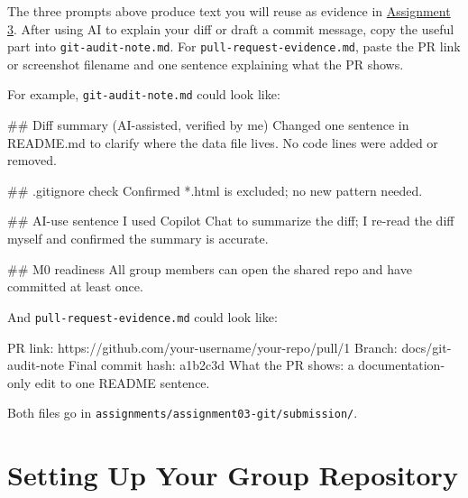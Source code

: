 \documentclass[
  letterpaper,
  DIV=11,
  numbers=noendperiod,
  oneside]{scrreprt}
\newenvironment{Shaded}{\begin{snugshade}}{\end{snugshade}}
\newcommand{\NormalTok}[1]{\textcolor[rgb]{0.00,0.23,0.31}{#1}}
\begin{document}
The three prompts above produce text you will reuse as evidence in
\href{../../assignments/assignment03-git/README.md}{Assignment 3}. After
using AI to explain your diff or draft a commit message, copy the useful
part into \texttt{git-audit-note.md}. For
\texttt{pull-request-evidence.md}, paste the PR link or screenshot
filename and one sentence explaining what the PR shows.

For example, \texttt{git-audit-note.md} could look like:

\begin{Shaded}
\begin{Highlighting}[numbers=left,,]
\NormalTok{\#\# Diff summary (AI{-}assisted, verified by me)}
\NormalTok{Changed one sentence in README.md to clarify where the data file lives.}
\NormalTok{No code lines were added or removed.}

\NormalTok{\#\# .gitignore check}
\NormalTok{Confirmed *.html is excluded; no new pattern needed.}

\NormalTok{\#\# AI{-}use sentence}
\NormalTok{I used Copilot Chat to summarize the diff; I re{-}read the diff myself}
\NormalTok{and confirmed the summary is accurate.}

\NormalTok{\#\# M0 readiness}
\NormalTok{All group members can open the shared repo and have committed at least once.}
\end{Highlighting}
\end{Shaded}

And \texttt{pull-request-evidence.md} could look like:

\begin{Shaded}
\begin{Highlighting}[numbers=left,,]
\NormalTok{PR link: https://github.com/your{-}username/your{-}repo/pull/1}
\NormalTok{Branch: docs/git{-}audit{-}note}
\NormalTok{Final commit hash: a1b2c3d}
\NormalTok{What the PR shows: a documentation{-}only edit to one README sentence.}
\end{Highlighting}
\end{Shaded}

Both files go in \texttt{assignments/assignment03-git/submission/}.

\chapter*{Setting Up Your Group
Repository}\label{setting-up-your-group-repository}

\end{document}
